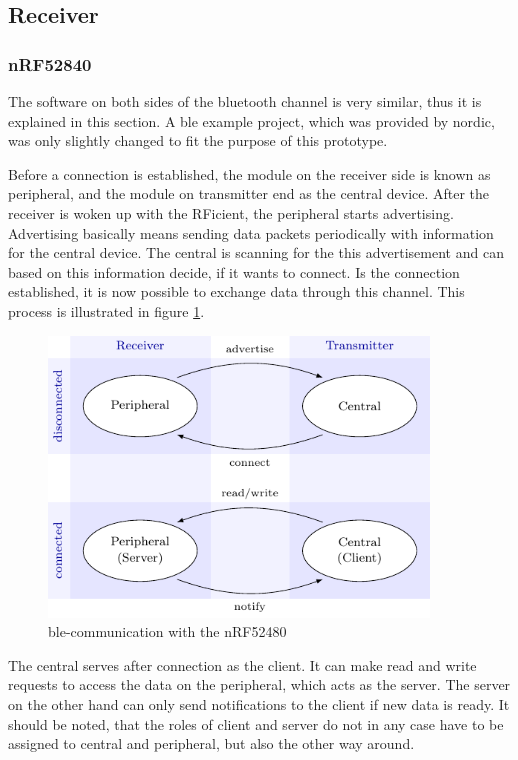 \subsection{Receiver}

\subsubsection{nRF52840}
The software on both sides of the bluetooth channel is very similar, thus it is explained in this section.
A \acs{ble} example project, which was provided by nordic, was only slightly changed to fit the purpose of this prototype.

Before a connection is established, the module on the receiver side is known as peripheral, and the module on transmitter end as the central device.
After the receiver is woken up with the RFicient, the peripheral starts advertising.
Advertising basically means sending data packets periodically with information for the central device.
The central is scanning for the this advertisement and can based on this information decide, if it wants to connect.
Is the connection established, it is now possible to exchange data through this channel.
This process is illustrated in figure \ref{software:ble}.
\begin{figure}[ht]
	\centering
	\includegraphics[width=0.9\textwidth]{4-development/software/graphics/ble.pdf}
	\caption{\acs{ble}-communication with the nRF52480\label{software:ble}}
\end{figure}

The central serves after connection as the client.
It can make read and write requests to access the data on the peripheral, which acts as the server.
The server on the other hand can only send notifications to the client if new data is ready.
It should be noted, that the roles of client and server do not in any case have to be assigned to central and peripheral, but also the other way around. 

